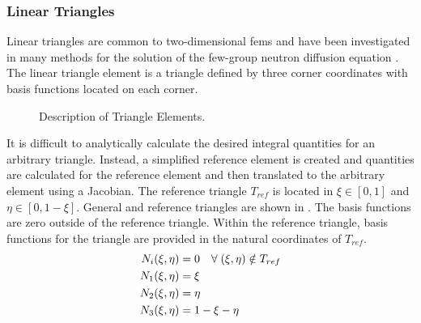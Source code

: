     \subsubsection{Linear Triangles}
      Linear triangles are common to two-dimensional \glspl{fem} and have been
      investigated in many methods for the solution of the few-group neutron
      diffusion equation \cite{Hosseini2017,Hosseini2013,Hosseini2015}.
      The linear triangle element is a triangle defined by three corner
      coordinates with basis functions located on each corner. 

      \begin{figure}
        \centering
        \vspace{0.2in}
        \caption{Description of Triangle Elements.}
        \label{fig:triangle_elements}
      \end{figure}

      It is difficult to analytically calculate the desired integral quantities
      for an arbitrary triangle. Instead, a simplified reference element is
      created and quantities are calculated for the reference element and then
      translated to the arbitrary element using a Jacobian.  The reference
      triangle $T_{ref}$ is located in $\xi \in [0,1]$ and $\eta \in [0,1-\xi]$.
      General and reference triangles are shown in .
      The basis functions are zero outside of the reference triangle. Within
      the reference triangle, basis functions for the triangle are provided in 
      the natural coordinates of $T_{ref}$.
      \begin{align}
        N_i(\xi,\eta) &= 0 \quad \forall \; (\xi,\eta) \notin T_{ref} \\
        N_1(\xi,\eta) &= \xi \\
        N_2(\xi,\eta) &= \eta \\
        N_3(\xi,\eta) &= 1-\xi-\eta
      \end{align}
      
